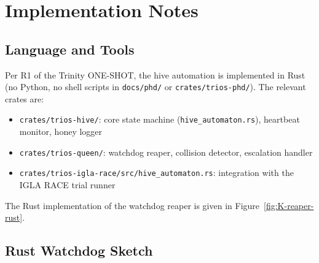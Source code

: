 \section{Implementation Notes}
\label{sec:K-implementation}

\subsection{Language and Tools}
\label{ssec:K-language}

Per R1 of the Trinity ONE-SHOT, the hive automation is implemented
in Rust (no Python, no shell scripts in \texttt{docs/phd/} or
\texttt{crates/trios-phd/}). The relevant crates are:
\begin{itemize}
  \item \texttt{crates/trios-hive/}: core state machine
    (\texttt{hive\_automaton.rs}), heartbeat monitor, honey logger
  \item \texttt{crates/trios-queen/}: watchdog reaper, collision
    detector, escalation handler
  \item \texttt{crates/trios-igla-race/src/hive\_automaton.rs}:
    integration with the IGLA RACE trial runner
\end{itemize}
The Rust implementation of the watchdog reaper is given in
Figure~\ref{fig:K-reaper-rust}.

\subsection{Rust Watchdog Sketch}
\label{ssec:K-rust-watchdog}

